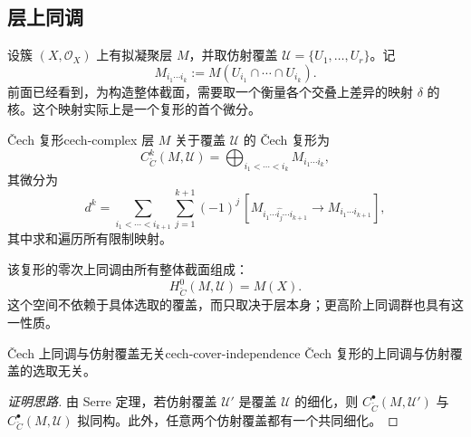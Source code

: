 \subsection{层上同调}\label{subsec:sheaf-cohomology}
设簇 $(X,\mathcal O_X)$ 上有拟凝聚层 $M$，并取仿射覆盖 $\mathcal U=\{U_1,\ldots,U_r\}$。记
\[
  M_{i_1\cdots i_k}:=M(U_{i_1}\cap\cdots\cap U_{i_k}).
\]
前面已经看到，为构造整体截面，需要取一个衡量各个交叠上差异的映射 $\delta$ 的核。这个映射实际上是一个复形的首个微分。

\begin{definition}{Čech 复形}{cech-complex}
层 $M$ 关于覆盖 $\mathcal U$ 的 Čech 复形为
\[
  C^k_{\check C}(M,\mathcal U)
  =\bigoplus_{i_1<\cdots<i_k}M_{i_1\cdots i_k},
\]
其微分为
\[
  d^k=\sum_{i_1<\cdots<i_{k+1}}\sum_{j=1}^{k+1}
  (-1)^j\,[M_{i_1\cdots\widehat{i_j}\cdots i_{k+1}}
  \longrightarrow M_{i_1\cdots i_{k+1}}],
\]
其中求和遍历所有限制映射。
\end{definition}

该复形的零次上同调由所有整体截面组成：
\[
  H^0_{\check C}(M,\mathcal U)=M(X).
\]
这个空间不依赖于具体选取的覆盖，而只取决于层本身；更高阶上同调群也具有这一性质。

\begin{lemma}{Čech 上同调与仿射覆盖无关}{cech-cover-independence}
Čech 复形的上同调与仿射覆盖的选取无关。
\end{lemma}
\begin{proof}[证明思路]
由 Serre 定理，若仿射覆盖 $\mathcal U'$ 是覆盖 $\mathcal U$ 的细化，则 $C^\bullet_{\check C}(M,\mathcal U')$ 与 $C^\bullet_{\check C}(M,\mathcal U)$ 拟同构。此外，任意两个仿射覆盖都有一个共同细化。
\end{proof}

